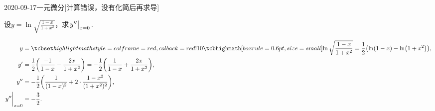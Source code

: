 \documentclass{ctexart}
\begin{document}
\begin{mathques}{2020-09-17}{一元微分}[计算错误，没有化简后再求导]
\begin{ques}
  设$y = \ln \sqrt{\frac{1 - x}{1 + x^2}}$，求$\eval{y''}_{x = 0}.$
\end{ques}
\begin{solu}
  \begin{align*}
    y &= \matherror{\ln \sqrt{\frac{1 - x}{1 + x^2}} = \frac{1}{2} \qty(\ln (1
    - x) - \ln(1 + x^2))},\\
    y' &= \frac{1}{2}\qty(\frac{-1}{1 - x} - \frac{2x}{1 + x^2})
    = - \frac{1}{2}\qty(\frac{1}{1 - x} + \frac{2x}{1 + x^2}),\\
    y'' &= -\frac{1}{2}\qty(\frac{1}{(1 - x)^2} + 2\cdot \frac{1 - x^2}{(1 +
    x^2)^2}),\\
    \eval{y''}_{x = 0} &= -\frac{3}{2}.
  \end{align*}
\end{solu}
\end{mathques}
\end{document}
